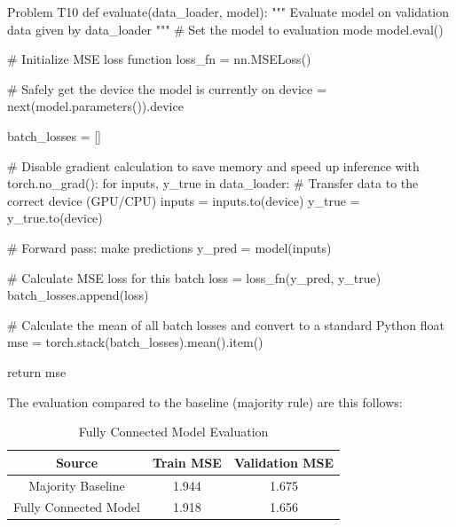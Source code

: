 \documentclass[12pt, a4paper]{article}
\begin{document}
            \begin{codeblock}{Problem T10}
                def evaluate(data_loader, model):
                    """
                    Evaluate model on validation data given by data_loader
                    """
                    # Set the model to evaluation mode
                    model.eval()

                    # Initialize MSE loss function
                    loss_fn = nn.MSELoss()

                    # Safely get the device the model is currently on
                    device = next(model.parameters()).device

                    batch_losses = []

                    # Disable gradient calculation to save memory and speed up inference
                    with torch.no_grad():
                        for inputs, y_true in data_loader:
                            # Transfer data to the correct device (GPU/CPU)
                            inputs = inputs.to(device)
                            y_true = y_true.to(device)
                            
                            # Forward pass: make predictions
                            y_pred = model(inputs)
                            
                            # Calculate MSE loss for this batch
                            loss = loss_fn(y_pred, y_true)
                            batch_losses.append(loss)

                    # Calculate the mean of all batch losses and convert to a standard Python float
                    mse = torch.stack(batch_losses).mean().item()

                    return mse
            \end{codeblock}

            \noindent The evaluation compared to the baseline (majority rule) are this follows:
            \begin{table}[h]
                \centering
                \begin{tabular}{|c|c|c|}
                    \hline
                    \textbf{Source} & \textbf{Train MSE} & \textbf{Validation MSE} \\
                    \hline \hline
                    Majority Baseline & 1.944 & 1.675 \\
                    Fully Connected Model & 1.918 & 1.656 \\
                    \hline
                \end{tabular}
                \caption{Fully Connected Model Evaluation}
            \end{table}
\end{document}
